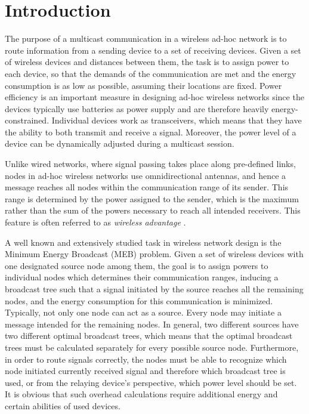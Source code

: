 \section{Introduction}
\label{intro}

The purpose of a multicast communication in a wireless ad-hoc network is to route information from a sending device to a set of receiving devices.
Given a set of wireless devices and distances between them, the task is to assign power to each device, so that the demands of the communication are met and the energy consumption is as low as possible, assuming their locations are fixed.
Power efficiency is an important measure in designing ad-hoc wireless networks since the devices typically use batteries as power supply and are therefore heavily energy-constrained.
Individual devices work as transceivers, which means that they have the ability to both transmit and receive a signal.
Moreover, the power level of a device can be dynamically adjusted during a multicast session.

Unlike wired networks, where signal passing takes place along pre-defined links, nodes in ad-hoc wireless networks use omnidirectional antennas, and hence a message reaches all nodes within the communication range of its sender.
This range is determined by the power assigned to the sender, which is the maximum rather than the sum of the powers necessary to reach all intended receivers.
This feature is often referred to as \emph{wireless advantage} \cite{Wieseltier00onthe}.

A well known and extensively studied task in wireless network design is the Minimum Energy Broadcast (MEB) problem.
Given a set of wireless devices with one designated source node among them, the goal is to assign powers to individual nodes  which determines their communication ranges, inducing a broadcast tree such that a signal initiated by the source reaches all the remaining nodes, and the energy consumption for this communication is minimized.
Typically, not only one node can act as a source.
Every node may initiate a message intended for the remaining nodes.
In general, two different sources have two different optimal broadcast trees, which means that the optimal broadcast trees must be calculated separately for every possible source node.
Furthermore, in order to route signals correctly, the nodes must be able to recognize which node initiated currently received signal and therefore which broadcast tree is used, or from the relaying device's perspective, which power level should be set.
It is obvious that such overhead calculations require additional energy and certain abilities of used devices.

